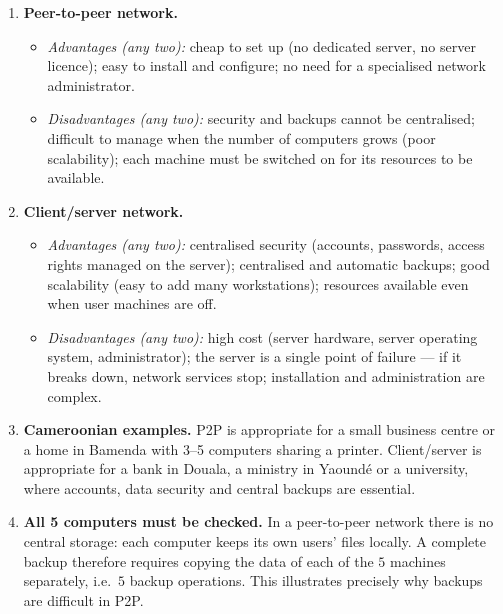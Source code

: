 \documentclass[11pt]{article}
\newcommand{\cle}[1]{{\popxbold\color{popdark}#1}}
\begin{document}
\begin{corrige}
\begin{enumerate}
\item \textbf{Peer-to-peer network.}
\begin{itemize}
\item \emph{Advantages (any two):} cheap to set up (no dedicated server, no server licence); easy to install and configure; no need for a specialised network administrator.
\item \emph{Disadvantages (any two):} security and backups cannot be centralised; difficult to manage when the number of computers grows (poor \cle{scalability}); each machine must be switched on for its resources to be available.
\end{itemize}
\item \textbf{Client/server network.}
\begin{itemize}
\item \emph{Advantages (any two):} centralised security (accounts, passwords, access rights managed on the server); centralised and automatic backups; good scalability (easy to add many workstations); resources available even when user machines are off.
\item \emph{Disadvantages (any two):} high cost (server hardware, server operating system, administrator); the server is a \cle{single point of failure} — if it breaks down, network services stop; installation and administration are complex.
\end{itemize}
\item \textbf{Cameroonian examples.} P2P is appropriate for a small business centre or a home in Bamenda with 3--5 computers sharing a printer. Client/server is appropriate for a bank in Douala, a ministry in Yaoundé or a university, where accounts, data security and central backups are essential.
\item \textbf{All 5 computers must be checked.} In a peer-to-peer network there is no central storage: each computer keeps its own users' files locally. A complete backup therefore requires copying the data of each of the $5$ machines separately, i.e.\ $5$ backup operations. This illustrates precisely why backups are difficult in P2P.
\end{enumerate}
\end{corrige}
\end{document}
